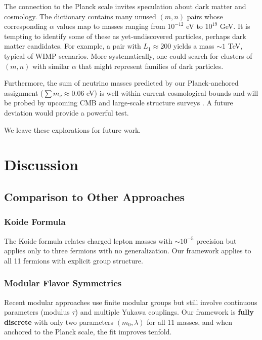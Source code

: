 \documentclass[11pt,a4paper]{article}
\begin{document}
The connection to the Planck scale invites speculation about dark matter and cosmology. The dictionary contains many unused $(m,n)$ pairs whose corresponding $\alpha$ values map to masses ranging from $10^{-12}$ eV to $10^{19}$ GeV. It is tempting to identify some of these as yet‑undiscovered particles, perhaps dark matter candidates. For example, a pair with $L_1 \approx 200$ yields a mass $\sim 1$ TeV, typical of WIMP scenarios. More systematically, one could search for clusters of $(m,n)$ with similar $\alpha$ that might represent families of dark particles.

Furthermore, the sum of neutrino masses predicted by our Planck‑anchored assignment ($\sum m_\nu \approx 0.06$ eV) is well within current cosmological bounds and will be probed by upcoming CMB and large‑scale structure surveys \cite{Planck2020, DESI2025}. A future deviation would provide a powerful test.

We leave these explorations for future work.

\section{Discussion}

\subsection{Comparison to Other Approaches}

\subsubsection{Koide Formula}

The Koide formula \cite{Koide1982} relates charged lepton masses with $\sim 10^{-5}$ precision but applies only to three fermions with no generalization. Our framework applies to all 11 fermions with explicit group structure.

\subsubsection{Modular Flavor Symmetries}

Recent modular approaches \cite{Feruglio2019, Kobayashi2023} use finite modular groups but still involve continuous parameters (modulus $\tau$) and multiple Yukawa couplings. Our framework is \textbf{fully discrete} with only two parameters $(m_0, \lambda)$ for all 11 masses, and when anchored to the Planck scale, the fit improves tenfold.
\end{document}
